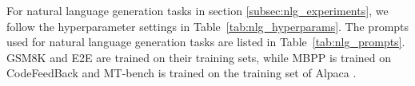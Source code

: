 \documentclass{article}
\theoremstyle{plain}
\theoremstyle{definition}
\theoremstyle{remark}
\begin{document}



\begin{table}[ht]
  \renewcommand\arraystretch{1.1}
  \centering
  \caption{Hyperparameters for image classification tasks.}
  \label{tab:image_hyperparams}
  
\end{table}

For natural language generation tasks in section \ref{subsec:nlg_experiments}, we follow the hyperparameter settings in Table~\ref{tab:nlg_hyperparams}. The prompts used for natural language generation tasks are listed in Table~\ref{tab:nlg_prompts}. GSM8K and E2E are trained on their training sets, while MBPP is trained on CodeFeedBack \cite{CODEFEEDBACK} and MT-bench is trained on the training set of Alpaca \cite{ALPACA}.

\end{document}

